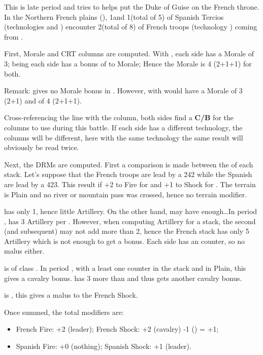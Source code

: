 \begin{exemple}
  This is late period  and \HIS tries to helps 
  put the Duke of Guise on the French throne. In the Northern French plains
  (\provinceArtois), 1\ARMY\faceplus and 1\LD (total of 5\LD) of
   Spanish Tercios (technologies \TMUS and \TTER) encounter
  2\ARMY\faceplus (total of 8\LD) of  French troops (technology
  \TMUS) coming from .

  First, Morale and CRT columns are computed. With \TMUS, each side has a
  Morale of 3; being  each side has a bonus of  to
  Morale; Hence the Morale is 4 (2+1+1) for both.

  Remark: \TTER gives no Morale bonus in \TMUS. However, with \TARQ \FRA would
  have a Morale of 3 (2+1) and \HIS of 4 (2+1+1).

  Cross-referencing the \TMUS line with the \TMUS column, both sides find a
  \textbf{C/B} for the columns to use during this battle. If each side has a
  different technology, the columns will be different, here with the same
  technology the same result will obviously be read twice.

  Next, the DRMs are computed. First a comparison is made between the \LeaderG
  of each stack. Let's suppose that the French troops are lead by a 242
  \LeaderG while the Spanish are lead by a 423. This result if +2 to Fire for
  \FRA and +1 to Shock for \HIS. The terrain is Plain and no river or
  mountain pass was crossed, hence no terrain modifier.

  \HIS has only 1\ARMY\Faceplus, hence little Artillery. On the other hand,
  \FRA may have enough\ldots In period , \FRA has 3 Artillery per
  \ARMY\Faceplus. However, when computing Artillery for a stack, the second
  (and subsequent) \ARMY may not add more than 2, hence the French stack has
  only 5 Artillery which is not enough to get a bonus. Each side has an \ARMY
  counter, so no malus either.

  \FRA is of class \CAIV. In period , with a least one \ARMY
  counter in the stack and in Plain, this gives a  cavalry
  bonus. \FRA has 3 more \LD than \HIS and thus gets another 
  cavalry bonus.

  \HIS is \TTER, this gives a  malus to the French Shock.

  Once summed, the total modifiers are:
  \begin{itemize}
  \item French Fire: +2 (leader); \quad French Shock: +2 (cavalry) -1 (\TTER)
    = +1;
  \item Spanish Fire: +0 (nothing); \quad Spanish Shock: +1 (leader).
  \end{itemize}


\end{exemple}
